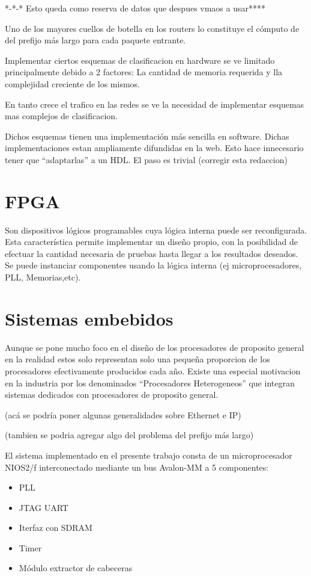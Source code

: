 *-*-* Esto queda como reserva de datos que despues vmaos a usar****



Uno de los mayores cuellos de botella en los routers lo constituye el cómputo de del prefijo más largo para cada paquete entrante.

Implementar ciertos esquemas de clasificacion en hardware se ve limitado principalmente debido a 2 factores: La cantidad de memoria requerida y lla complejidad creciente de los mismos.

En tanto crece el trafico en las redes se ve la necesidad de implementar esquemas mas complejos de clasificacion.

Dichos esquemas tienen una implementación más sencilla en software. Dichas implementaciones estan ampliamente difundidas en la web.
Esto hace innecesario tener que “adaptarlas” a un HDL. El paso es trivial (corregir esta redaccion)

\section{FPGA}
Son dispositivos lógicos programables cuya lógica interna puede ser reconfigurada. Esta característica permite implementar un diseño propio, con la posibilidad de efectuar la cantidad necesaria de pruebas hasta llegar a los resultados deseados. Se puede instanciar componentes usando la lógica interna (ej microprocesadores, PLL, Memorias,etc).

\section{Sistemas embebidos}
Aunque se pone mucho foco en el  diseño de los procesadores de proposito general en la realidad estos solo representan solo una pequeña proporcion de los procesadores efectivamente producidos cada año.  Existe una especial motivacion en la industria por los denominados “Procesadores Heterogeneos” que integran sistemas dedicados con procesadores de proposito general.

(acá se podría poner algunas generalidades sobre Ethernet e IP)

(tambien se podria agregar algo del problema del prefijo más largo)


El sistema implementado en el presente trabajo consta de un microprocesador NIOS2/f interconectado mediante un bus Avalon-MM a 5 componentes: 
\begin{itemize}
\item PLL
\item JTAG UART
\item Iterfaz con SDRAM
\item Timer
\item Módulo extractor de cabeceras
\end{itemize}


